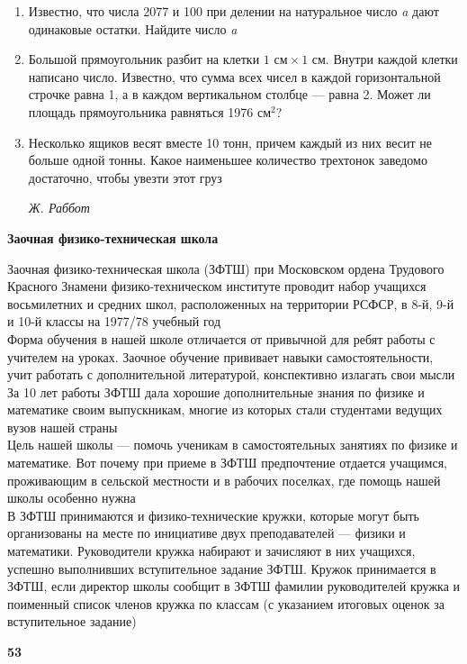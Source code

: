 \begin{multicols}{2}
\begin{enumerate}[itemsep=0pt, wide=0pt, itemindent=3em]
            \item Известно, что числа 2077 и 100 при делении на натуральное число \textit{a} дают одинаковые остатки. Найдите число \textit{a}
            \item Большой прямоугольник разбит на клетки $1\textit{ см}\times1\textit{ см}$. Внутри каждой клетки написано число. Известно, что сумма всех чисел в каждой горизонтальной строчке равна 1, а в каждом вертикальном столбце --- равна 2. Может ли площадь прямоугольника равняться 1976 $\textit{см}^2$?
            \item Несколько ящиков весят вместе 10 тонн, причем каждый из них весит не больше одной тонны. Какое наименьшее количество трехтонок заведомо достаточно, чтобы увезти этот груз
            \begin{flushright}
                \vspace{-\baselineskip} %
                \textit{Ж. Раббот}
            \end{flushright}
        \end{enumerate}
         
    \end{multicols}
    \begin{center}
        \textbf{\LARGE Заочная физико-техническая школа}    
    \end{center}
    Заочная физико-техническая школа (ЗФТШ) при Московском ордена Трудового Красного Знамени физико-техническом институте проводит набор учащихся восьмилетних и средних школ, расположенных на территории РСФСР, в 8-й, 9-й и 10-й классы на 1977/78 учебный год\\
    \indent Форма обучения в нашей школе отличается от привычной для ребят работы с учителем на уроках. Заочное обучение прививает навыки самостоятельности, учит работать с дополнительной литературой, конспективно излагать свои мысли\\
    \indent За 10 лет работы ЗФТШ дала хорошие дополнительные знания по физике и математике своим выпускникам, многие из которых стали студентами ведущих вузов нашей страны\\
    \indent Цель нашей школы --- помочь ученикам в самостоятельных занятиях по физике и математике. Вот почему при приеме в ЗФТШ предпочтение отдается учащимся, проживающим в сельской местности и в рабочих поселках, где помощь нашей школы особенно нужна\\
    \indent В ЗФТШ принимаются и физико-технические кружки, которые могут быть организованы на месте по инициативе двух преподавателей --- физики и математики. Руководители кружка набирают и зачисляют в них учащихся, успешно выполнивших вступительное задание ЗФТШ. Кружок принимается в ЗФТШ, если директор школы сообщит в ЗФТШ фамилии руководителей кружка и поименный список членов кружка по классам (с указанием итоговых оценок за вступительное задание)
    \begin{flushright}
        \vspace{-\baselineskip}
        \textbf{53}
    \end{flushright}

